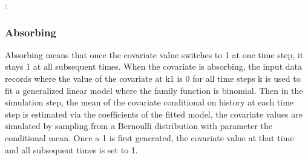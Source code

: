 \documentclass[letterpaper,10pt,english]{sphinxmanual}
\begin{document}
\begin{sphinxVerbatim}[commandchars=\\\{\}]
        
         
      \PYG{p}{[} \PYG{p}{]}
      \PYG{p}{[} \PYG{p}{]}
       
      
\end{sphinxVerbatim}

\sphinxAtStartPar
{}:
\begin{quote}

\end{quote}


\subsubsection{Absorbing}
\label{\detokenize{Specifications/Covariate model:absorbing}}
\sphinxAtStartPar
Absorbing means that once the covariate value switches to 1 at one time step, it stays 1 at all subsequent times.
When the covariate is absorbing, the input data records where the value of the covariate at k\sphinxhyphen{}1 is 0
for all time steps k is used to fit a generalized linear model where the family function is binomial.
Then in the simulation step, the mean of the covariate conditional on history
at each time step is estimated via the coefficients of the fitted model, the covariate values are simulated
by sampling from a Bernoulli distribution with parameter the conditional mean. Once a 1 is first generated, the covariate value at that
time and all subsequent times is set to 1.
\end{document}
